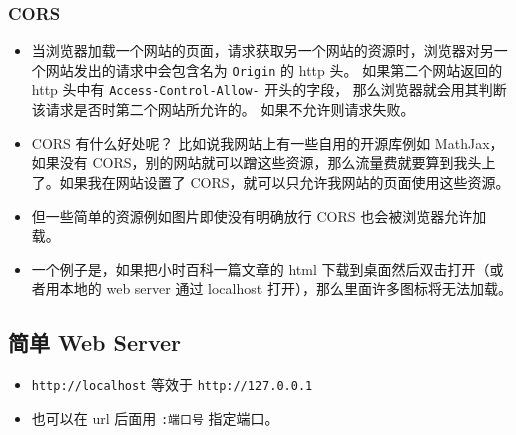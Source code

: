 \subsubsection{CORS}
\begin{itemize}
\item 当浏览器加载一个网站的页面，请求获取另一个网站的资源时，浏览器对另一个网站发出的请求中会包含名为 \verb`Origin` 的 http 头。 如果第二个网站返回的 http 头中有 \verb`Access-Control-Allow-` 开头的字段， 那么浏览器就会用其判断该请求是否时第二个网站所允许的。 如果不允许则请求失败。
\item CORS 有什么好处呢？ 比如说我网站上有一些自用的开源库例如 MathJax，如果没有 CORS，别的网站就可以蹭这些资源，那么流量费就要算到我头上了。如果我在网站设置了 CORS，就可以只允许我网站的页面使用这些资源。
\item 但一些简单的资源例如图片即使没有明确放行 CORS 也会被浏览器允许加载。
\item 一个例子是，如果把小时百科一篇文章的 html 下载到桌面然后双击打开（或者用本地的 web server 通过 localhost 打开），那么里面许多图标将无法加载。
\end{itemize}

\subsection{简单 Web Server}
\begin{itemize}
\item \verb`http://localhost` 等效于 \verb`http://127.0.0.1`
\item 也可以在 url 后面用 \verb`:端口号` 指定端口。
\end{itemize}
